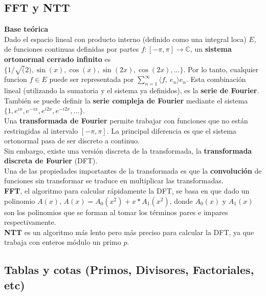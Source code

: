 \subsection{FFT y NTT}

\textbf{Base teórica} \\
Dado el espacio lineal con producto interno (definido como una integral loca) 
$E$, de funciones continuas definidas por partes $f \colon [-\pi, \pi] \rightarrow \mathbb{C}$, 
un \textbf{sistema ortonormal cerrado infinito} es $\{1/\sqrt(2), \sin(x), \cos(x), \sin(2x), 
\cos(2x), ...\}$.  Por lo tanto, cualquier funcion $f \in E$ puede ser representada por 
$\sum_{n=1}^{\infty} \langle f,\ e_n \rangle e_n$. Esta combinación lineal (utilizando
la sumatoria y el sistema ya definidos), es la \textbf{serie de Fourier}. \\ 
También se puede definir la \textbf{serie compleja de Fourier} mediante el
sistema $\{1, e^{ix}, e^{-ix}, e^{i2x}, e^{-i2x}, ...\}$. \\
Una \textbf{transformada de Fourier} permite trabajar con funciones que no están
restringidas al intervalo $[-\pi, \pi]$. La principal diferencia es que el sistema
ortonormal pasa de ser discreto a continuo. \\
Sin embargo, existe una versión discreta de la transformada, la \textbf{transformada 
discreta de Fourier} (DFT). \\
Una de las propiedades importantes de la transformada es que la \textbf{convolución} 
de funciones sin transformar se traduce en multiplicar las transformadas. \\
\textbf{FFT}, el algoritmo para calcular rápidamente la DFT, se basa en que
dado un polinomio $A(x)$, $A(x) = A_0(x^2) + x*A_1(x^2)$, donde $A_0(x)$ y $A_1(x)$ 
son los polinomios que se forman al tomar los términos pares e impares respectivamente. \\
\textbf{NTT} es un algoritmo más lento pero más preciso para calcular la DFT,
ya que trabaja con enteros módulo un primo $p$.


\subsection{Tablas y cotas (Primos, Divisores, Factoriales, etc)}
